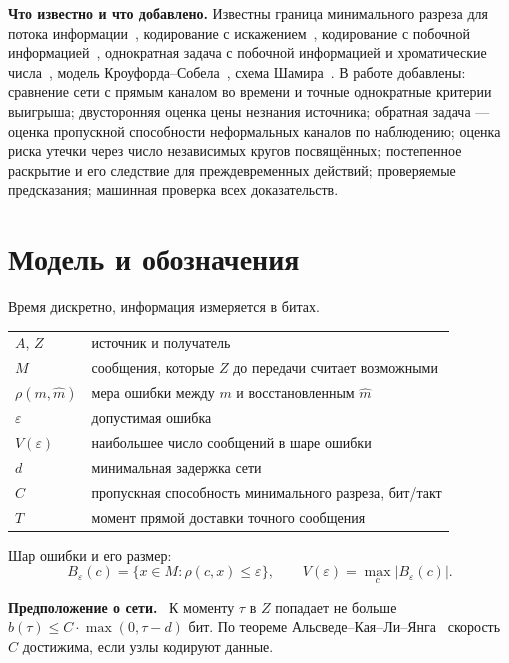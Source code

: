 \documentclass[10pt,a4paper,twocolumn]{article}
\theoremstyle{plain}
\newenvironment{dfn}[1]{\par\smallskip\noindent\textbf{#1.}\ }{\par\smallskip}
\begin{document}
\textbf{Что известно и что добавлено.} Известны граница минимального разреза для потока информации~\cite{ahlswede}, кодирование с искажением~\cite{shannon}, кодирование с побочной информацией~\cite{slepianwolf,wynerziv}, однократная задача с побочной информацией и хроматические числа~\cite{witsenhausen}, модель Кроуфорда–Собела~\cite{crawfordsobel}, схема Шамира~\cite{shamir}. В работе добавлены: сравнение сети с прямым каналом во времени и точные однократные критерии выигрыша; двусторонняя оценка цены незнания источника; обратная задача — оценка пропускной способности неформальных каналов по наблюдению; оценка риска утечки через число независимых кругов посвящённых; постепенное раскрытие и его следствие для преждевременных действий; проверяемые предсказания; машинная проверка всех доказательств.

\section{Модель и обозначения}

Время дискретно, информация измеряется в битах.

\begin{center}
\small
\begin{tabularx}{\columnwidth}{@{}lX@{}}
\toprule
$A$, $Z$ & источник и получатель \\
$M$ & сообщения, которые $Z$ до передачи считает возможными \\
$\rho(m,\hat m)$ & мера ошибки между $m$ и восстановленным $\hat m$ \\
$\varepsilon$ & допустимая ошибка \\
$V(\varepsilon)$ & наибольшее число сообщений в шаре ошибки \\
$d$ & минимальная задержка сети \\
$C$ & пропускная способность минимального разреза, бит/такт \\
$T$ & момент прямой доставки точного сообщения \\
\bottomrule
\end{tabularx}
\end{center}

Шар ошибки и его размер:
\[
B_\varepsilon(c) = \{x \in M : \rho(c,x) \le \varepsilon\},\qquad V(\varepsilon) = \max_c |B_\varepsilon(c)|.
\]

\begin{dfn}{Предположение о сети}
К моменту $\tau$ в $Z$ попадает не больше $b(\tau) \le C\cdot\max(0,\tau-d)$ бит. По теореме Альсведе–Кая–Ли–Янга~\cite{ahlswede} скорость $C$ достижима, если узлы кодируют данные.
\end{dfn}
\end{document}
